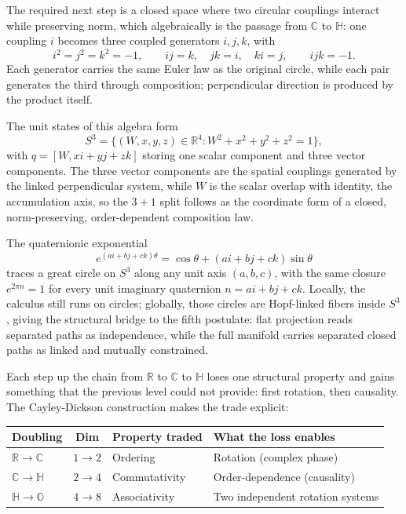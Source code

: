 \documentclass[12pt]{article}
\begin{document}
The required next step is a closed space where two circular couplings interact while preserving norm, which algebraically is the passage from $\mathbb{C}$ to $\mathbb{H}$: one coupling $i$ becomes three coupled generators $i,j,k$, with
\[
    i^2=j^2=k^2=-1,\qquad ij=k,\quad jk=i,\quad ki=j,\qquad ijk=-1.
\]
Each generator carries the same Euler law as the original circle, while each pair generates the third through composition; perpendicular direction is produced by the product itself.

The unit states of this algebra form
\[
    S^3=\{(W,x,y,z)\in\mathbb{R}^4: W^2+x^2+y^2+z^2=1\},
\]
with $q=[W,xi+yj+zk]$ storing one scalar component and three vector components. The three vector components are the spatial couplings generated by the linked perpendicular system, while $W$ is the scalar overlap with identity, the accumulation axis, so the $3{+}1$ split follows as the coordinate form of a closed, norm-preserving, order-dependent composition law.

The quaternionic exponential
\[
    e^{(ai+bj+ck)\theta}
    =
    \cos\theta+(ai+bj+ck)\sin\theta
\]
traces a great circle on $S^3$ along any unit axis $(a,b,c)$, with the same closure $e^{2\pi n}=1$ for every unit imaginary quaternion $n=ai+bj+ck$. Locally, the calculus still runs on circles; globally, those circles are Hopf-linked fibers inside $S^3$, giving the structural bridge to the fifth postulate: flat projection reads separated paths as independence, while the full manifold carries separated closed paths as linked and mutually constrained.

Each step up the chain from $\mathbb{R}$ to $\mathbb{C}$ to $\mathbb{H}$ loses one structural property and gains something that the previous level could not provide: first rotation, then causality. The Cayley-Dickson construction makes the trade explicit:

\begin{center}
\begin{tabular}{l c l l}
    \toprule
    Doubling & Dim & Property traded & What the loss enables \\
    \midrule
    $\mathbb{R} \to \mathbb{C}$ & $1 \to 2$ & Ordering & Rotation (complex phase) \\
    $\mathbb{C} \to \mathbb{H}$ & $2 \to 4$ & Commutativity & Order-dependence (causality) \\
    $\mathbb{H} \to \mathbb{O}$ & $4 \to 8$ & Associativity & Two independent rotation systems \\
    \bottomrule
\end{tabular}
\end{center}
\end{document}
